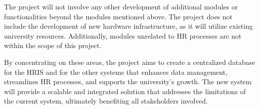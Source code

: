     The project will not involve any other development of additional modules or functionalities beyond the modules mentioned above. The project does not include the development of new hardware infrastructure, as it will utilize existing university resources. Additionally, modules unrelated to HR processes are not within the scope of this project.
    
    By concentrating on these areas, the project aims to create a centralized database for the HRIS and for the other systems that enhances data management, streamlines HR processes, and supports the university's growth. The new system will provide a scalable and integrated solution that addresses the limitations of the current system, ultimately benefiting all stakeholders involved.


